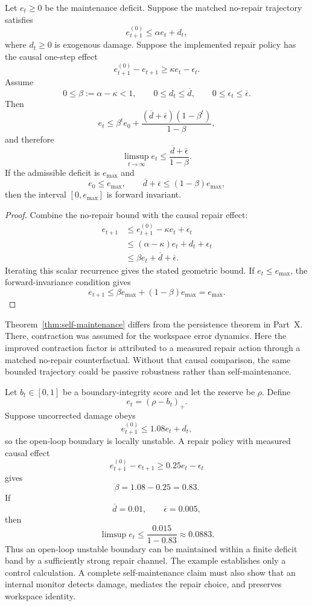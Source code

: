 
\begin{theorem}
\label{thm:self-maintenance}
Let \(e_t\geq0\) be the maintenance deficit. Suppose the matched no-repair
trajectory satisfies
\[
e_{t+1}^{(0)}
\leq
\alpha e_t+d_t,
\]
where \(d_t\geq0\) is exogenous damage. Suppose the implemented repair policy
has the causal one-step effect
\[
e_{t+1}^{(0)}-e_{t+1}
\geq
\kappa e_t-\epsilon_t.
\]
Assume
\[
0\leq\beta:=\alpha-\kappa<1,
\qquad
0\leq d_t\leq\overline d,
\qquad
0\leq\epsilon_t\leq\overline\epsilon.
\]
Then
\[
\boxed{
e_t
\leq
\beta^te_0
+
\frac{(\overline d+\overline\epsilon)(1-\beta^t)}{1-\beta},
}
\]
and therefore
\[
\boxed{
\limsup_{t\to\infty}e_t
\leq
\frac{\overline d+\overline\epsilon}{1-\beta}.
}
\]
If the admissible deficit is \(e_{\max}\) and
\[
e_0\leq e_{\max},
\qquad
\overline d+\overline\epsilon
\leq
(1-\beta)e_{\max},
\]
then the interval \([0,e_{\max}]\) is forward invariant.
\end{theorem}

\begin{proof}
Combine the no-repair bound with the causal repair effect:
\[
\begin{aligned}
e_{t+1}
&\leq
 e_{t+1}^{(0)}-\kappa e_t+\epsilon_t\\
&\leq
(\alpha-\kappa)e_t+d_t+\epsilon_t\\
&\leq
\beta e_t+\overline d+\overline\epsilon.
\end{aligned}
\]
Iterating this scalar recurrence gives the stated geometric bound. If
\(e_t\leq e_{\max}\), the forward-invariance condition gives
\[
e_{t+1}
\leq
\beta e_{\max}
+(1-\beta)e_{\max}
=e_{\max}.
\]
\end{proof}

Theorem~\ref{thm:self-maintenance} differs from the persistence theorem in
Part~X. There, contraction was assumed for the workspace error dynamics. Here
the improved contraction factor is attributed to a measured repair action
through a matched no-repair counterfactual. Without that causal comparison,
the same bounded trajectory could be passive robustness rather than
self-maintenance.


Let \(b_t\in[0,1]\) be a boundary-integrity score and let the reserve be
\(\rho\). Define
\[
e_t=(\rho-b_t)_+.
\]
Suppose uncorrected damage obeys
\[
e_{t+1}^{(0)}
\leq
1.08e_t+d_t,
\]
so the open-loop boundary is locally unstable. A repair policy with measured
causal effect
\[
e_{t+1}^{(0)}-e_{t+1}
\geq
0.25e_t-\epsilon_t
\]
gives
\[
\beta=1.08-0.25=0.83.
\]
If
\[
\overline d=0.01,
\qquad
\overline\epsilon=0.005,
\]
then
\[
\limsup e_t
\leq
\frac{0.015}{1-0.83}
\approx0.0883.
\]
Thus an open-loop unstable boundary can be maintained within a finite deficit
band by a sufficiently strong repair channel. The example establishes only a
control calculation. A complete self-maintenance claim must also show that an
internal monitor detects damage, mediates the repair choice, and preserves
workspace identity.

